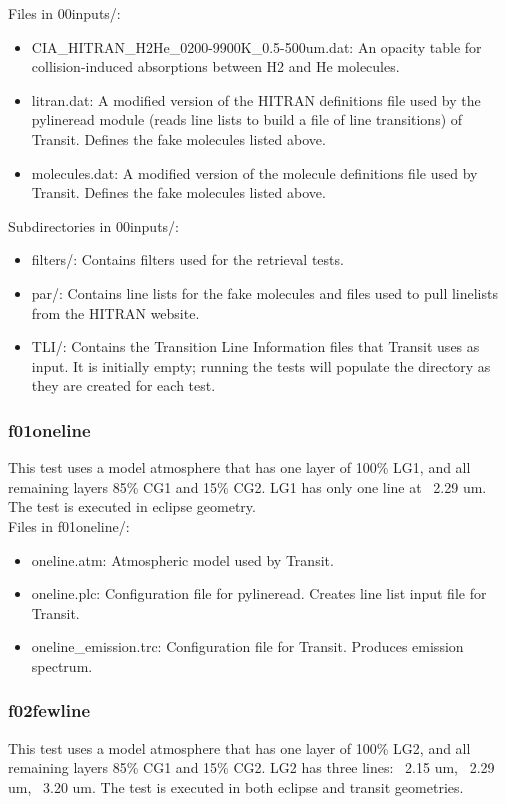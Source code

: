 \documentclass[letterpaper, 12pt]{article}
\begin{document}
Files in 00inputs/:
\begin{itemize} \itemsep0pt
  \item CIA{\_}HITRAN{\_}H2He{\_}0200-9900K{\_}0.5-500um.dat: An opacity table for 
        collision-induced absorptions between H2 and He molecules.
  \item litran.dat: A modified version of the HITRAN definitions file used by 
        the pylineread module (reads line lists to build a file of line 
        transitions) of Transit. Defines the fake molecules listed above.
  \item molecules.dat: A modified version of the molecule definitions file 
        used by Transit. Defines the fake molecules listed above.
\end{itemize}

Subdirectories in 00inputs/:
\begin{itemize} \itemsep0pt
  \item filters/: Contains filters used for the retrieval tests.
  \item par/: Contains line lists for the fake molecules and files used to pull 
        linelists from the HITRAN website.
  \item TLI/: Contains the Transition Line Information files that Transit uses 
        as input. It is initially empty; running the tests will populate the 
        directory as they are created for each test.
\end{itemize}

\subsubsection{f01oneline}
\label{sec:oneline}
This test uses a model atmosphere that has one layer of 100\% LG1, and all 
remaining layers 85\% CG1 and 15\% CG2. LG1 has only one line at ~2.29 um. 
The test is executed in eclipse geometry.\\

Files in f01oneline/:
\begin{itemize} \itemsep0pt
  \item oneline.atm: Atmospheric model used by Transit.
  \item oneline.plc: Configuration file for pylineread. Creates line 
        list input file for Transit.
  \item oneline{\_}emission.trc: Configuration file for Transit. Produces 
        emission spectrum.
\end{itemize}

\subsubsection{f02fewline}
\label{sec:fewline}
This test uses a model atmosphere that has one layer of 100\% LG2, and all 
remaining layers 85\% CG1 and 15\% CG2. LG2 has three lines: ~2.15 um, 
~2.29 um, ~3.20 um. The test is executed in both eclipse and transit 
geometries.\\
\end{document}
